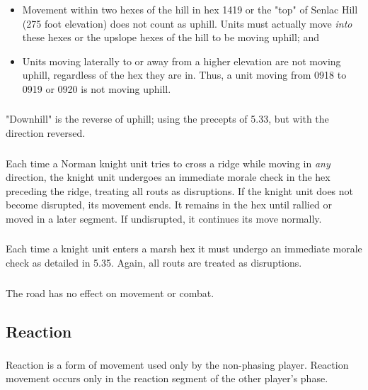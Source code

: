 \begin{itemize}
  \item Movement within two hexes of the hill in hex 1419 or the "top" of Senlac Hill (275 foot elevation) does not count as uphill. Units must actually move \textit{into} these hexes or the upslope hexes of the hill to be moving uphill; and
  \item Units moving laterally to or away from a higher elevation are not moving uphill, regardless of the hex they are in. Thus, a unit moving from 0918 to 0919 or 0920 is not moving uphill.
\end{itemize}

\subsubsection[Downhill]{} "Downhill" is the reverse of uphill; using the precepts of 5.33, but with the direction reversed.

\subsubsection[Norman Knights]{} Each time a Norman knight unit tries to cross a ridge while moving in \textit{any} direction, the knight unit undergoes an immediate morale check in the hex preceding the ridge, treating all routs as disruptions. If the knight unit does not become disrupted, its movement ends. It remains in the hex until rallied or moved in a later segment. If undisrupted, it continues its move normally.

\subsubsection[Knights and Marsh]{} Each time a knight unit enters a marsh hex it must undergo an immediate morale check as detailed in 5.35. Again, all routs are treated as disruptions.

\subsubsection[The Road]{} The road has no effect on movement or combat.

\subsection{Reaction}

\subsubsection[Reaction Defined]{} Reaction is a form of movement used only by the non-phasing player. Reaction movement occurs only in the reaction segment of the other player's phase.

